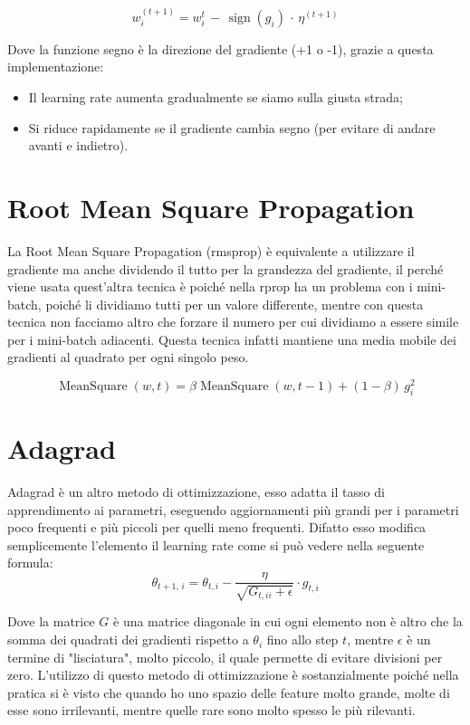 \begin{equation}
    w_i^{(t+1)}=w_i^t\,-\,\operatorname{sign}(g_i)\,\cdot\,\eta^{(t+1)}
\end{equation}

Dove la funzione segno è la direzione del gradiente (+1 o -1), grazie a questa implementazione:
\begin{itemize}
    \item Il learning rate aumenta gradualmente se siamo sulla giusta strada;
    \item Si riduce rapidamente se il gradiente cambia segno (per evitare di andare avanti e indietro). 
\end{itemize}

\section{Root Mean Square Propagation}

La Root Mean Square Propagation (rmsprop) è equivalente a utilizzare il gradiente ma anche dividendo il tutto per la grandezza del gradiente, il perché viene usata quest'altra tecnica è poiché nella rprop ha un problema con i mini-batch, poiché li dividiamo tutti per un valore differente, mentre con questa tecnica non facciamo altro che forzare il numero per cui dividiamo a essere simile per i mini-batch adiacenti. Questa tecnica infatti mantiene una media mobile dei gradienti al quadrato per ogni singolo peso.

\begin{equation}
    \operatorname{MeanSquare}(w,t) = \beta \operatorname{MeanSquare}(w,t-1) + (1-\beta)\,g_i^2
\end{equation}

\section{Adagrad}
Adagrad è un altro metodo di ottimizzazione, esso adatta il tasso di apprendimento ai parametri, eseguendo aggiornamenti più grandi per i parametri poco frequenti e più piccoli per quelli meno frequenti. Difatto esso modifica semplicemente l'elemento il learning rate come si può vedere nella seguente formula:
\begin{equation}
    \theta_{t+1,\,i} = \theta_{t,i} - \frac{\eta}{\sqrt{G_{t,ii} + \epsilon}}\cdot g_{t,i}
\end{equation}

Dove la matrice $G$ è una matrice diagonale in cui ogni elemento non è altro che la somma dei quadrati dei gradienti rispetto a $\theta_i$ fino allo step $t$, mentre $\epsilon$ è un termine di "lisciatura", molto piccolo, il quale permette di evitare divisioni per zero. L'utilizzo di questo metodo di ottimizzazione è sostanzialmente poiché nella pratica si è visto che quando ho uno spazio delle feature molto grande, molte di esse sono irrilevanti, mentre quelle rare sono molto spesso le più rilevanti.

